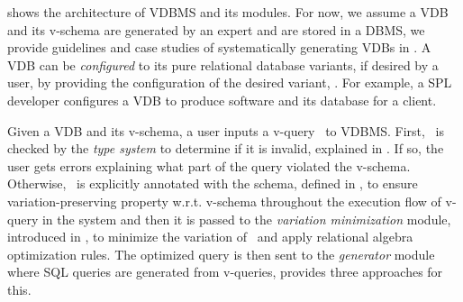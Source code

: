 
 shows the architecture of VDBMS and its modules.
For now, we assume a VDB and its v-schema are generated by an 
expert and are stored in a DBMS, we provide guidelines and case studies of
systematically generating VDBs in 
. A VDB can be \emph{configured} to its pure relational 
database variants, if desired by a user, by providing the configuration
of the desired variant, .
For example, a SPL developer configures a VDB to produce 
software and its database for a client.

Given a VDB and its v-schema, a user inputs a v-query \vQ\ to VDBMS.
%
First, \vQ\ is checked by the \emph{type system} to determine if it is invalid, explained in 
. 
If so, the user gets errors explaining what part of the 
query violated the v-schema.
Otherwise, 
\vQ\ is explicitly annotated with the schema,
defined in ,
to ensure variation-preserving property w.r.t. v-schema throughout the execution flow of v-query 
in the system and then
%
it is passed to the \emph{variation minimization} module, introduced in 
, to minimize the variation of \vQ\ and apply
relational algebra optimization rules. 
%
The optimized query is then sent to the \emph{generator} module where
SQL queries are generated from v-queries,  provides three
approaches for this.

